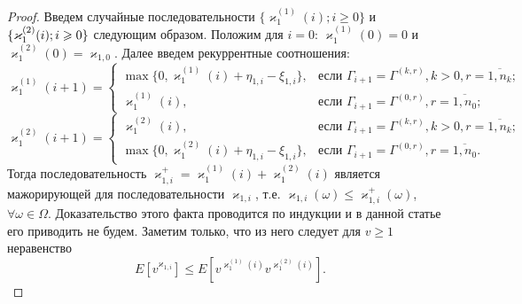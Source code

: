 \documentclass[12pt]{extarticle}
\theoremstyle{theorem}
\theoremstyle{remark}
\renewcommand*{\hm}[1]{#1\nobreak\discretionary{}%
	{\hbox{$\mathsurround=0pt #1$}}{}}%
\begin{document}
\begin{proof}
 Введем случайные последовательности $\{\varkappa_{1}^{(1)}(i); i\geqslant0\}$ и $\{\varkappa_{1}^{(2)}(i); i \hm\geqslant 0\}$ следующим образом. Положим для $i=0$: $\varkappa_{1}^{(1)}(0)=0$ и $\varkappa_{1}^{(2)}(0)=\varkappa_{1,0}$. Далее введем рекуррентные соотношения:  
\begin{equation*}
  \varkappa_{1}^{(1)}(i+1) =
  \begin{cases}
    \max{\{0,\varkappa_{1}^{(1)}(i) + \eta_{1,i} - \xi_{1,i}\}},&  \text{если } \Gamma_{i+1}=\Gamma^{(k,r)}, k>0, r=\overline{1,n_k}; \\
    \varkappa_{1}^{(1)}(i),&  \text{если } \Gamma_{i+1}=\Gamma^{(0,r)}, r=\overline{1,n_0};
  \end{cases}
\end{equation*}
\begin{equation*}
  \varkappa_{1}^{(2)}(i+1) =
  \begin{cases}
    \varkappa_{1}^{(2)}(i),&  \text{если } \Gamma_{i+1}=\Gamma^{(k,r)}, k>0, r=\overline{1,n_k};\\
    \max{\{0,\varkappa_{1}^{(2)}(i) + \eta_{1,i} - \xi_{1,i}\}},&  \text{если } \Gamma_{i+1}=\Gamma^{(0,r)}, r=\overline{1,n_0}.
  \end{cases}
\end{equation*}
Тогда последовательность $\varkappa_{1,i}^+=\varkappa_{1}^{(1)}(i) + \varkappa_{1}^{(2)}(i)$ является мажорирующей для последовательности $\varkappa_{1,i}$, т.е. $\varkappa_{1,i}(\omega) \leqslant \varkappa_{1,i}^+(\omega)$, $\forall \omega \in \Omega$. Доказательство этого факта проводится по индукции и в данной статье его приводить не будем. Заметим только, что из него следует для $v\geqslant 1$ неравенство
\begin{equation}
E[v^{\varkappa_{1,i}}]\leqslant E[v^{\varkappa_{1}^{(1)}(i)} v^{\varkappa_{1}^{(2)}(i)}].
\label{cenzor:estimate}
\end{equation}
                               


\end{proof}
\end{document}
